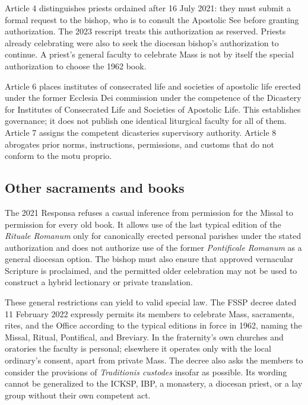 Article 4 distinguishes priests ordained after 16 July 2021: they must submit a formal request to the bishop, who is to consult the Apostolic See before granting authorization. The 2023 rescript treats this authorization as reserved. Priests already celebrating were also to seek the diocesan bishop's authorization to continue. A priest's general faculty to celebrate Mass is not by itself the special authorization to choose the 1962 book.

Article 6 places institutes of consecrated life and societies of apostolic life erected under the former Ecclesia Dei commission under the competence of the Dicastery for Institutes of Consecrated Life and Societies of Apostolic Life. This establishes governance; it does not publish one identical liturgical faculty for all of them. Article 7 assigns the competent dicasteries supervisory authority. Article 8 abrogates prior norms, instructions, permissions, and customs that do not conform to the motu proprio.

\subsection{Other sacraments and books}

The 2021 Responsa refuses a casual inference from permission for the Missal to permission for every old book. It allows use of the last typical edition of the \emph{Rituale Romanum} only for canonically erected personal parishes under the stated authorization and does not authorize use of the former \emph{Pontificale Romanum} as a general diocesan option. The bishop must also ensure that approved vernacular Scripture is proclaimed, and the permitted older celebration may not be used to construct a hybrid lectionary or private translation.

These general restrictions can yield to valid special law. The FSSP decree dated 11 February 2022 expressly permits its members to celebrate Mass, sacraments, rites, and the Office according to the typical editions in force in 1962, naming the Missal, Ritual, Pontifical, and Breviary. In the fraternity's own churches and oratories the faculty is personal; elsewhere it operates only with the local ordinary's consent, apart from private Mass. The decree also asks the members to consider the provisions of \emph{Traditionis custodes} insofar as possible. Its wording cannot be generalized to the ICKSP, IBP, a monastery, a diocesan priest, or a lay group without their own competent act.


